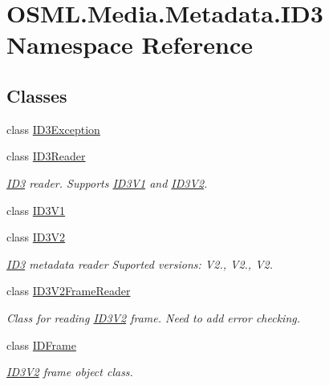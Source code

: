 \hypertarget{namespaceOSML_1_1Media_1_1Metadata_1_1ID3}{}\section{O\+S\+M\+L.\+Media.\+Metadata.\+I\+D3 Namespace Reference}
\label{namespaceOSML_1_1Media_1_1Metadata_1_1ID3}
\subsection*{Classes}
\begin{DoxyCompactItemize}
\item 
class \mbox{\hyperlink{classOSML_1_1Media_1_1Metadata_1_1ID3_1_1ID3Exception}{I\+D3\+Exception}}
\item 
class \mbox{\hyperlink{classOSML_1_1Media_1_1Metadata_1_1ID3_1_1ID3Reader}{I\+D3\+Reader}}
\begin{DoxyCompactList}\small\item\em \mbox{\hyperlink{namespaceOSML_1_1Media_1_1Metadata_1_1ID3}{I\+D3}} reader. Supports \mbox{\hyperlink{classOSML_1_1Media_1_1Metadata_1_1ID3_1_1ID3V1}{I\+D3\+V1}} and \mbox{\hyperlink{classOSML_1_1Media_1_1Metadata_1_1ID3_1_1ID3V2}{I\+D3\+V2}}. \end{DoxyCompactList}\item 
class \mbox{\hyperlink{classOSML_1_1Media_1_1Metadata_1_1ID3_1_1ID3V1}{I\+D3\+V1}}
\item 
class \mbox{\hyperlink{classOSML_1_1Media_1_1Metadata_1_1ID3_1_1ID3V2}{I\+D3\+V2}}
\begin{DoxyCompactList}\small\item\em \mbox{\hyperlink{namespaceOSML_1_1Media_1_1Metadata_1_1ID3}{I\+D3}} metadata reader Suported versions\+: V2., V2., V2. \end{DoxyCompactList}\item 
class \mbox{\hyperlink{classOSML_1_1Media_1_1Metadata_1_1ID3_1_1ID3V2FrameReader}{I\+D3\+V2\+Frame\+Reader}}
\begin{DoxyCompactList}\small\item\em Class for reading \mbox{\hyperlink{classOSML_1_1Media_1_1Metadata_1_1ID3_1_1ID3V2}{I\+D3\+V2}} frame. Need to add error checking. \end{DoxyCompactList}\item 
class \mbox{\hyperlink{classOSML_1_1Media_1_1Metadata_1_1ID3_1_1IDFrame}{I\+D\+Frame}}
\begin{DoxyCompactList}\small\item\em \mbox{\hyperlink{classOSML_1_1Media_1_1Metadata_1_1ID3_1_1ID3V2}{I\+D3\+V2}} frame object class. \end{DoxyCompactList}\end{DoxyCompactItemize}
